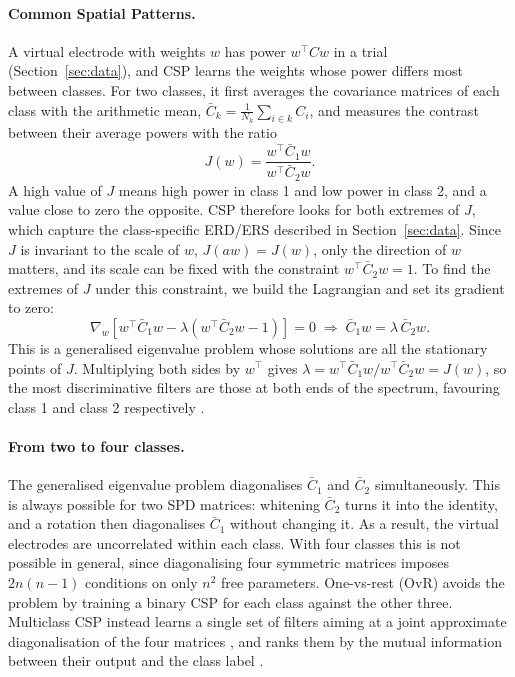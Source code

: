 \paragraph{Common Spatial Patterns.}
A virtual electrode with weights $w$ has power $w^\top C w$ in a trial (Section~\ref{sec:data}), and CSP learns the weights whose power differs most between classes. For two classes, it first averages the covariance matrices of each class with the arithmetic mean, $\bar{C}_k = \frac{1}{N_k} \sum_{i \in k} C_i$, and measures the contrast between their average powers with the ratio
\begin{equation}
  J(w) = \frac{w^\top \bar{C}_1 w}{w^\top \bar{C}_2 w}.
  \label{eq:csp_ratio}
\end{equation}
A high value of $J$ means high power in class 1 and low power in class 2, and a value close to zero the opposite. CSP therefore looks for both extremes of $J$, which capture the class-specific ERD/ERS described in Section~\ref{sec:data}. Since $J$ is invariant to the scale of $w$, $J(aw) = J(w)$, only the direction of $w$ matters, and its scale can be fixed with the constraint $w^\top \bar{C}_2 w = 1$. To find the extremes of $J$ under this constraint, we build the Lagrangian and set its gradient to zero:
\begin{equation}
  \nabla_w \left[ w^\top \bar{C}_1 w - \lambda \left( w^\top \bar{C}_2 w - 1 \right) \right] = 0
  \;\Rightarrow\;
  \bar{C}_1 w = \lambda \, \bar{C}_2 w.
  \label{eq:gevp}
\end{equation}
This is a generalised eigenvalue problem whose solutions are all the stationary points of $J$. Multiplying both sides by $w^\top$ gives $\lambda = w^\top \bar{C}_1 w / w^\top \bar{C}_2 w = J(w)$, so the most discriminative filters are those at both ends of the spectrum, favouring class 1 and class 2 respectively \citep{blankertz2008}.

\paragraph{From two to four classes.}
The generalised eigenvalue problem diagonalises $\bar{C}_1$ and $\bar{C}_2$ simultaneously. This is always possible for two SPD matrices: whitening $\bar{C}_2$ turns it into the identity, and a rotation then diagonalises $\bar{C}_1$ without changing it. As a result, the virtual electrodes are uncorrelated within each class. With four classes this is not possible in general, since diagonalising four symmetric matrices imposes $2n(n-1)$ conditions on only $n^2$ free parameters. One-vs-rest (OvR) avoids the problem by training a binary CSP for each class against the other three. Multiclass CSP instead learns a single set of filters aiming at a joint approximate diagonalisation of the four matrices \citep{pham2001}, and ranks them by the mutual information between their output and the class label \citep{grossewentrup2008}.

